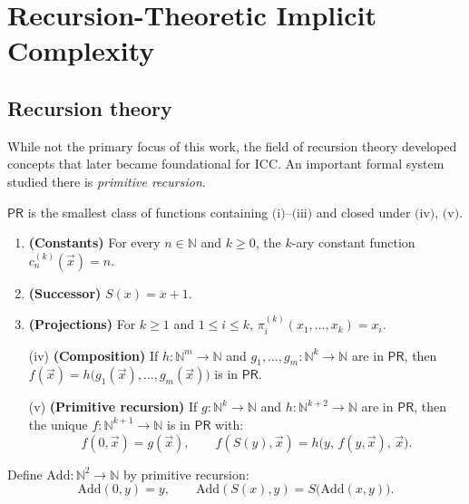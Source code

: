 
\chapter{Recursion-Theoretic Implicit Complexity}
\label{chap:recursion-theory}

\section{Recursion theory}
While not the primary focus of this work, the field of recursion theory developed concepts
that later became foundational for ICC\@. An important formal system studied there is \emph{primitive recursion}.

\begin{definition}
\(\mathsf{PR}\) is the smallest class of functions containing \(\text{(i)}\)--\(\text{(iii)}\) and closed under \(\text{(iv)}\), \(\text{(v)}\).
\begin{enumerate}[label=(\roman*)]
\item \textbf{(Constants)} For every \(n\in\mathbb{N}\) and \(k\ge 0\), the \(k\)-ary constant function
      \(c_{n}^{(k)}(\vec x)=n\).
\item \textbf{(Successor)} \(S(x)=x+1\).
\item \textbf{(Projections)} For \(k\ge 1\) and \(1\le i\le k\),
      \(\pi_i^{(k)}(x_1,\dots,x_k)=x_i\).
\item[(iv)] \textbf{(Composition)} If \(h:\mathbb{N}^m\to\mathbb{N}\) and
      \(g_1,\dots,g_m:\mathbb{N}^k\to\mathbb{N}\) are in \(\mathsf{PR}\), then
      \(f(\vec x)=h\big(g_1(\vec x),\dots,g_m(\vec x)\big)\) is in \(\mathsf{PR}\).
\item[(v)] \textbf{(Primitive recursion)} If \(g:\mathbb{N}^k\to\mathbb{N}\) and
      \(h:\mathbb{N}^{k+2}\to\mathbb{N}\) are in \(\mathsf{PR}\), then the unique
      \(f:\mathbb{N}^{k+1}\to\mathbb{N}\) is in \(\mathsf{PR}\) with:
      \[
      f(0,\vec x)=g(\vec x),\qquad
      f(S(y),\vec x)=h\big(y,\,f(y,\vec x),\,\vec x\big).
      \]

\end{enumerate}
\end{definition}

\begin{example}[Addition]
Define \(\mathrm{Add}:\mathbb{N}^2\to\mathbb{N}\) by primitive recursion:
\[
\mathrm{Add}(0,y)=y, \qquad
\mathrm{Add}(S(x),y)=S\big(\mathrm{Add}(x,y)\big).
\]
\end{example}


